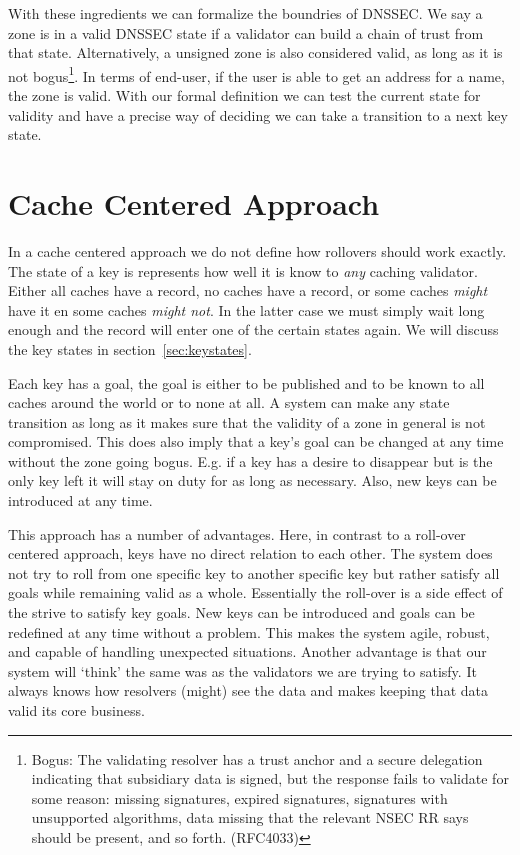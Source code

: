 \documentclass[twoside, a4paper]{article}
\begin{document}
With these ingredients we can formalize the boundries of DNSSEC. We say 
a zone is in a valid DNSSEC state if a validator can build a chain of 
trust from that state. Alternatively, a unsigned zone is also considered
valid, as long as it is not bogus\footnote{Bogus: 
		The validating resolver has a trust anchor and a secure
	  delegation indicating that subsidiary data is signed, but the 
	  response fails to validate for some reason: missing 
	  signatures, expired signatures, signatures with unsupported 
	  algorithms, data missing that the relevant NSEC RR says should 
	  be present, and so forth. (RFC4033) }. In terms of end-user, 
	  if the user is able to get an address for
a name, the zone is valid. With our formal definition we can test the
current state for validity and have a precise way of deciding we can
take a transition to a next key state.

\section{Cache Centered Approach}

In a cache centered approach we do not define how rollovers should 
work exactly. The state of a key is represents how well it is know 
to \emph{any} caching validator. Either all caches have a record, no 
caches have a record, or some caches \emph{might} have it en some 
caches \emph{might not}. In the latter case we must simply wait long 
enough and the record will enter one of the certain states again. We 
will discuss the key states in section~\ref{sec:keystates}.

Each key has a goal, the goal is either to be published and to be 
known to all caches around the world or to none at all. A system can 
make any state transition as long as it makes sure that the validity 
of a zone in general is not compromised. This does also imply that a 
key's goal can be changed at any time without the zone going bogus. 
E.g. if a key has a desire to disappear but is the only key left it 
will stay on duty for as long as necessary. Also, new keys can be 
introduced at any time.

This approach has a number of advantages. Here, in contrast to a 
roll-over centered approach, keys have no direct relation to each 
other. The system does not try to roll from one specific key to 
another specific key but rather satisfy all goals while remaining 
valid as a whole. Essentially the roll-over is a side effect of the 
strive to satisfy key goals. New keys can be introduced and goals 
can be redefined at any time without a problem. This makes the 
system agile, robust, and capable of handling unexpected situations. 
Another advantage is that our system will `think' the same was as 
the validators we are trying to satisfy. It always knows how 
resolvers (might) see the data and makes keeping that data valid its 
core business. 
\end{document}
